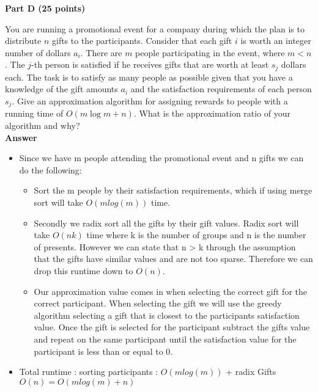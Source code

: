 \documentclass{article}
\begin{document}
\begin{center}
{\bf Part D (25 points)}
\end{center}

 You are running a promotional event for a
company during which the plan is to distribute $n$ gifts to the
participants. Consider that each gift $i$ is worth an integer number
of dollars $a_i$. There are $m$ people participating in the event,
where $m < n$. The $j$-th person is satisfied if he receives gifts
that are worth at least $s_j$ dollars each. The task is to satisfy as
many people as possible given that you have a knowledge of the gift
amounts $a_i$ and the satisfaction requirements of each person
$s_j$. Give an approximation algorithm for assigning rewards to people
with a running time of $O(m\log m+n)$. What is the approximation ratio
of your algorithm and why?\\

\textbf{ Answer }
\begin{itemize}
\item Since we have m people attending the promotional event and n gifts we can do the following:

\begin{itemize}
\item Sort the m people by their satisfaction requirements, which if using merge sort will take $O(mlog(m))$ time. 

\item Secondly we radix sort all the gifts by their gift values. Radix sort will take $O(nk)$ time where k is the number of groups and n is the number of presents. However we can state that n > k through the assumption that the gifts have similar values and are not too sparse. Therefore we can drop this runtime down to $O(n)$.

\item Our approximation value comes in when selecting the correct gift for the correct participant. When selecting the gift we will use the greedy algorithm selecting a gift that is closest to the participants satisfaction value. Once the gift is selected for the participant subtract the gifts value and repeat on the same participant until the satisfaction value for the participant is less than or equal to 0.
\end{itemize}

\item Total runtime : sorting participants : $O(mlog(m))$ + radix Gifts $O(n) = O(mlog(m) + n)$
\end{itemize}
\end{document}
